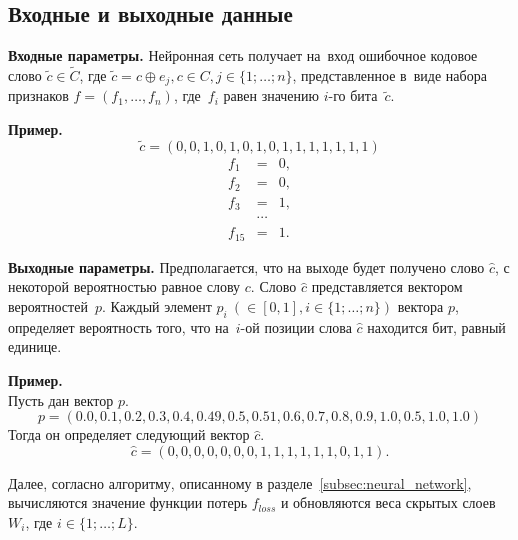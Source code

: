\subsection{Входные и выходные данные}\label{subsec:input_output}

\textbf{Входные параметры.} Нейронная сеть получает на~вход ошибочное кодовое слово $\widetilde{c} \in \widetilde{C}$,
где $\widetilde{c} = c \oplus e_j, c \in C, j \in \{1;\dots; n\}$,
представленное в~виде набора признаков $f = (f_1, \dots, f_n)$, где~$f_i$ равен значению $i$-го бита~$\widetilde{c}$.

\textbf{Пример.}
\begin{equation}
    \nonumber\widetilde{c} = (0, 0, 1, 0, 1, 0, 1, 0, 1, 1, 1, 1, 1, 1, 1)
\end{equation}
\begin{eqnarray}
    \nonumber f_1 &=& 0, \\
    \nonumber f_2 &=& 0, \\
    \nonumber f_3 &=& 1, \\
    \nonumber &\cdots& \\
    \nonumber f_{15} &=& 1.
\end{eqnarray}

\textbf{Выходные параметры.} Предполагается, что на выходе будет получено слово $\hat{c}$, с некоторой вероятностью равное слову $c$.
Слово $\hat{c}$ представляется вектором вероятностей~$p$. Каждый элемент $p_i~(\in [0, 1], i \in \{1;\dots; n\})$ вектора $p$, определяет вероятность того, что на~$i$-ой позиции слова $\hat{c}$ находится бит, равный единице.

\textbf{Пример.} \\
Пусть дан вектор $p$.
$$p = (0.0, 0.1, 0.2, 0.3, 0.4, 0.49, 0.5, 0.51, 0.6, 0.7, 0.8, 0.9, 1.0, 0.5, 1.0, 1.0)$$
Тогда он определяет следующий вектор $\hat{c}$.
$$\hat{c} = (0, 0, 0, 0, 0, 0, 0, 1, 1, 1, 1, 1, 1, 0, 1, 1).$$

Далее, согласно алгоритму, описанному в разделе~\ref{subsec:neural_network}, вычисляются значение функции потерь $f_{loss}$
и обновляются веса скрытых слоев $W_i$, где $i\in\{1;\dots; L\}$.
